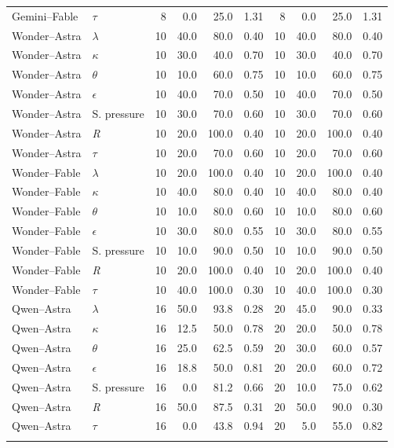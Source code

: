 \documentclass[11pt]{article}
\begin{document}
\begin{longtable}{@{}llrrrr@{\quad}rrrr@{}}
Gemini--Fable & $\tau$ & 8 & 0.0 & 25.0 & 1.31 & 8 & 0.0 & 25.0 & 1.31 \\ \addlinespace[3pt]
Wonder--Astra & $\lambda$ & 10 & 40.0 & 80.0 & 0.40 & 10 & 40.0 & 80.0 & 0.40 \\
Wonder--Astra & $\kappa$ & 10 & 30.0 & 40.0 & 0.70 & 10 & 30.0 & 40.0 & 0.70 \\
Wonder--Astra & $\theta$ & 10 & 10.0 & 60.0 & 0.75 & 10 & 10.0 & 60.0 & 0.75 \\
Wonder--Astra & $\epsilon$ & 10 & 40.0 & 70.0 & 0.50 & 10 & 40.0 & 70.0 & 0.50 \\
Wonder--Astra & S. pressure & 10 & 30.0 & 70.0 & 0.60 & 10 & 30.0 & 70.0 & 0.60 \\
Wonder--Astra & \textit{R} & 10 & 20.0 & 100.0 & 0.40 & 10 & 20.0 & 100.0 & 0.40 \\
Wonder--Astra & $\tau$ & 10 & 20.0 & 70.0 & 0.60 & 10 & 20.0 & 70.0 & 0.60 \\ \addlinespace[3pt]
Wonder--Fable & $\lambda$ & 10 & 20.0 & 100.0 & 0.40 & 10 & 20.0 & 100.0 & 0.40 \\
Wonder--Fable & $\kappa$ & 10 & 40.0 & 80.0 & 0.40 & 10 & 40.0 & 80.0 & 0.40 \\
Wonder--Fable & $\theta$ & 10 & 10.0 & 80.0 & 0.60 & 10 & 10.0 & 80.0 & 0.60 \\
Wonder--Fable & $\epsilon$ & 10 & 30.0 & 80.0 & 0.55 & 10 & 30.0 & 80.0 & 0.55 \\
Wonder--Fable & S. pressure & 10 & 10.0 & 90.0 & 0.50 & 10 & 10.0 & 90.0 & 0.50 \\
Wonder--Fable & \textit{R} & 10 & 20.0 & 100.0 & 0.40 & 10 & 20.0 & 100.0 & 0.40 \\
Wonder--Fable & $\tau$ & 10 & 40.0 & 100.0 & 0.30 & 10 & 40.0 & 100.0 & 0.30 \\ \addlinespace[3pt]
Qwen--Astra & $\lambda$ & 16 & 50.0 & 93.8 & 0.28 & 20 & 45.0 & 90.0 & 0.33 \\
Qwen--Astra & $\kappa$ & 16 & 12.5 & 50.0 & 0.78 & 20 & 20.0 & 50.0 & 0.78 \\
Qwen--Astra & $\theta$ & 16 & 25.0 & 62.5 & 0.59 & 20 & 30.0 & 60.0 & 0.57 \\
Qwen--Astra & $\epsilon$ & 16 & 18.8 & 50.0 & 0.81 & 20 & 20.0 & 60.0 & 0.72 \\
Qwen--Astra & S. pressure & 16 & 0.0 & 81.2 & 0.66 & 20 & 10.0 & 75.0 & 0.62 \\
Qwen--Astra & \textit{R} & 16 & 50.0 & 87.5 & 0.31 & 20 & 50.0 & 90.0 & 0.30 \\
Qwen--Astra & $\tau$ & 16 & 0.0 & 43.8 & 0.94 & 20 & 5.0 & 55.0 & 0.82 \\ \addlinespace[3pt]

\end{longtable}
\end{document}
